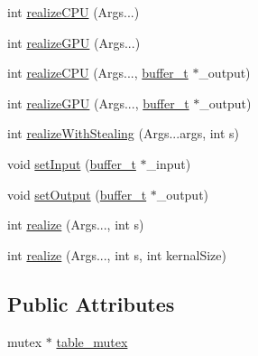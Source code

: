 \begin{DoxyCompactItemize}
int \hyperlink{class_fusion_1_1_static_1_1_static_dispatch_ac74fd593ecfdd0c17cd3efb057a23601}{realize\-C\-P\-U} (Args...)
\item 
int \hyperlink{class_fusion_1_1_static_1_1_static_dispatch_a58ebbf76aad64618f27a051393cf06ac}{realize\-G\-P\-U} (Args...)
\item 
int \hyperlink{class_fusion_1_1_static_1_1_static_dispatch_a5242c852017c8bff8e2758da82fdfcdc}{realize\-C\-P\-U} (Args..., \hyperlink{structbuffer__t}{buffer\-\_\-t} $\ast$\-\_\-output)
\item 
int \hyperlink{class_fusion_1_1_static_1_1_static_dispatch_aa49de8865a4152db390e546dd17690a5}{realize\-G\-P\-U} (Args..., \hyperlink{structbuffer__t}{buffer\-\_\-t} $\ast$\-\_\-output)
\item 
int \hyperlink{class_fusion_1_1_static_1_1_static_dispatch_ad778f6d90895d75b920b173e2331d193}{realize\-With\-Stealing} (Args...\-args, int s)
\item 
void \hyperlink{class_fusion_1_1_static_1_1_static_dispatch_ab82336c566e180be617f49c708cdf7f0}{set\-Input} (\hyperlink{structbuffer__t}{buffer\-\_\-t} $\ast$\-\_\-input)
\item 
void \hyperlink{class_fusion_1_1_static_1_1_static_dispatch_a7c3cb7fa73040dbe2cfcbc3038119e48}{set\-Output} (\hyperlink{structbuffer__t}{buffer\-\_\-t} $\ast$\-\_\-output)
\item 
int \hyperlink{class_fusion_1_1_static_1_1_static_dispatch_ae167b1f550c4cc5260834109de6e5797}{realize} (Args..., int s)
\item 
int \hyperlink{class_fusion_1_1_static_1_1_static_dispatch_a4756d0081a1b0211d8f977a7b3aae110}{realize} (Args..., int s, int kernal\-Size)
\end{DoxyCompactItemize}
\subsection*{Public Attributes}
\begin{DoxyCompactItemize}
\item 
mutex $\ast$ \hyperlink{class_fusion_1_1_static_1_1_static_dispatch_adcf07c56b063db9d5aaa8eed6107d4b5}{table\-\_\-mutex}
\end{DoxyCompactItemize}


